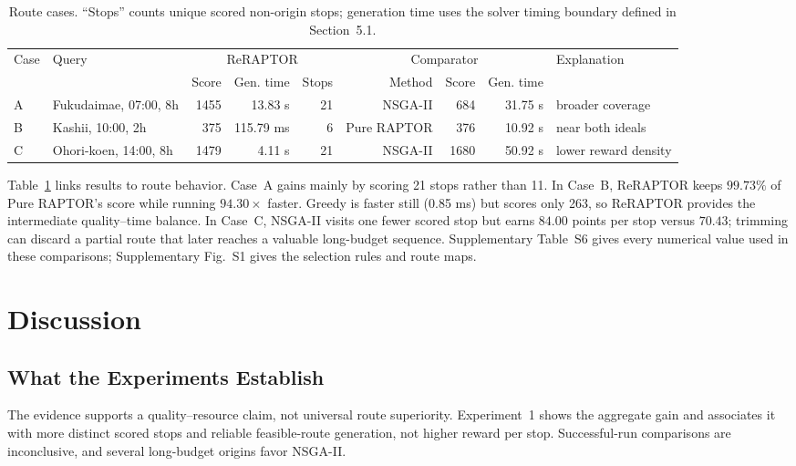 \begin{table}[t]
    \centering
    \caption{Route cases. ``Stops'' counts unique scored non-origin stops;
    generation time uses the solver timing boundary defined in Section~5.1.}
    \label{tab:route_cases}
    \footnotesize
    \setlength{\tabcolsep}{4pt}
    \begin{tabular}{@{}llrrrrrrl@{}}
        \toprule
        Case & Query & \multicolumn{3}{c}{ReRAPTOR} &
        \multicolumn{3}{c}{Comparator} & Explanation \\
        \cmidrule(lr){3-5}\cmidrule(lr){6-8}
        & & Score & Gen. time & Stops & Method & Score & Gen. time & \\
        \midrule
        A & Fukudaimae, 07:00, 8h & 1455 & 13.83 s & 21 & NSGA-II & 684 & 31.75 s & broader coverage \\
        B & Kashii, 10:00, 2h & 375 & 115.79 ms & 6 & Pure RAPTOR & 376 & 10.92 s & near both ideals \\
        C & Ohori-koen, 14:00, 8h & 1479 & 4.11 s & 21 & NSGA-II & 1680 & 50.92 s & lower reward density \\
        \bottomrule
    \end{tabular}
\end{table}

Table~\ref{tab:route_cases} links results to route behavior.
Case~A gains mainly by scoring 21 stops rather than 11. In Case~B,
ReRAPTOR keeps \(99.73\%\) of Pure RAPTOR's score while running
\(94.30\times\) faster. Greedy is faster still (0.85 ms) but scores only 263,
so ReRAPTOR provides the intermediate quality--time balance. In Case~C,
NSGA-II visits one fewer scored stop but
earns \(84.00\) points per stop versus \(70.43\); trimming can discard a partial
route that later reaches a valuable long-budget sequence. Supplementary
Table~S6 gives every numerical value used in these comparisons;
Supplementary Fig.~S1 gives the selection rules and route maps.

\section{Discussion}
\subsection{What the Experiments Establish}
The evidence supports a quality--resource claim, not universal route
superiority. Experiment~1 shows the aggregate gain and associates it with more
distinct scored stops and reliable feasible-route generation, not higher reward
per stop. Successful-run comparisons are inconclusive, and several long-budget
origins favor NSGA-II.

